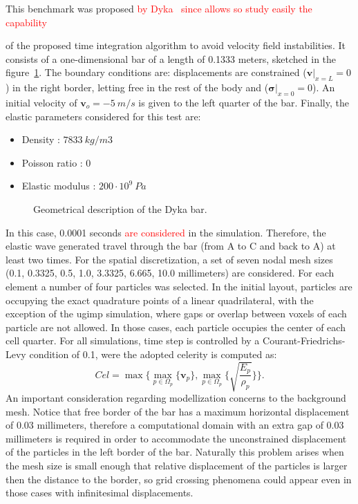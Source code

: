 \documentclass[preprint,12pt,a4paper]{elsarticle}
\newcommand{\vect}[1]{
  \ensuremath{\mathbf{{#1}}}
}
\newcommand{\tens}[1]{
  \ensuremath{\mathbf{{#1}}}
}
\newcommand{\PNA}[1]{
  \textcolor{red}{{#1}}
}
\begin{document}
This benchmark was proposed \PNA{by Dyka~\cite{Dyka1995} since allows so study easily the capability}
of the proposed time integration algorithm to avoid velocity
field instabilities. It consists of a one-dimensional bar of a length of 0.1333 meters, sketched in the
figure~\ref{fig:Dyka_Bar}. The boundary conditions are: displacements are constrained ($\vect{v} \rvert_{x=L} = 0$) in the right
border, letting free in the rest of the body and ($\tens{\sigma} \rvert_{x=0} =
0$). An initial velocity of $\vect{v}_o = - 5\ m/s$ is given to the
left quarter of the bar. Finally, the elastic parameters considered for this test are:
\begin{itemize} 
\item  Density : $7833\ kg/m3$
\item  Poisson ratio : $0$
\item  Elastic modulus : $200 \cdot 10^9\ Pa$
\end{itemize}
\begin{figure}\sidecaption
  \centering
  \resizebox{\hsize}{!}{
    }
  \caption{Geometrical description of the Dyka \cite{Dyka1995} bar.}
  \label{fig:Dyka_Bar}
\end{figure}
In this case, 0.0001 seconds \PNA{are considered }in the simulation. Therefore, the elastic wave generated travel through the bar
(from A to C and back to A) at least two times. For the spatial
discretization, a set of seven nodal mesh sizes (0.1, 0.3325, 0.5,
1.0, 3.3325, 6.665, 10.0 millimeters) are considered. For each element a number of
four particles was selected. In the initial layout, particles are
occupying the exact quadrature points of a linear quadrilateral, with
the exception of the \acrshort{ugimp} simulation, where gaps or overlap between
voxels of each particle are not allowed. In those cases, each particle
occupies the center of each cell quarter. For all simulations, time step
is controlled by a Courant-Friedrichs-Levy condition of 0.1, were the adopted
celerity is computed as:
\begin{equation}
  \label{eq:Cel}
  Cel = \max\{\max_{p \in \Omega_p}\{ \vect{v}_p \} , \max_{p \in \Omega_p}\{ \sqrt{\frac{E_p}{\rho_p}} \} \}.
\end{equation}
An important consideration regarding modellization concerns to the
background mesh. Notice that free border of the bar has a maximum
horizontal displacement of 0.03 millimeters, therefore 
a computational domain with an extra gap of 0.03 millimeters is
required in order to accommodate the unconstrained displacement of the
particles in the left border of the bar. Naturally this problem arises
when the mesh size is small enough that relative displacement of the
particles is larger then the distance to the border, so grid crossing
phenomena could appear even in those cases with infinitesimal
displacements.
\end{document}
